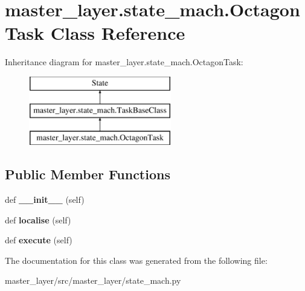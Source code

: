 \hypertarget{classmaster__layer_1_1state__mach_1_1OctagonTask}{}\section{master\+\_\+layer.\+state\+\_\+mach.\+Octagon\+Task Class Reference}
\label{classmaster__layer_1_1state__mach_1_1OctagonTask}
Inheritance diagram for master\+\_\+layer.\+state\+\_\+mach.\+Octagon\+Task\+:\begin{figure}[H]
\begin{center}
\leavevmode
\includegraphics[height=3.000000cm]{classmaster__layer_1_1state__mach_1_1OctagonTask}
\end{center}
\end{figure}
\subsection*{Public Member Functions}
\begin{DoxyCompactItemize}
\item 
\mbox{\label{classmaster__layer_1_1state__mach_1_1OctagonTask_aab8fd91555f8d6962c7cf2199132c8f8}} 
def {\bfseries \+\_\+\+\_\+init\+\_\+\+\_\+} (self)
\item 
\mbox{\label{classmaster__layer_1_1state__mach_1_1OctagonTask_ae291b244ebd1e04d10b3e56a05728a53}} 
def {\bfseries localise} (self)
\item 
\mbox{\label{classmaster__layer_1_1state__mach_1_1OctagonTask_a7171d42a13de1ae33c8855b84ac5379d}} 
def {\bfseries execute} (self)
\end{DoxyCompactItemize}


The documentation for this class was generated from the following file\+:\begin{DoxyCompactItemize}
\item 
master\+\_\+layer/src/master\+\_\+layer/state\+\_\+mach.\+py\end{DoxyCompactItemize}
